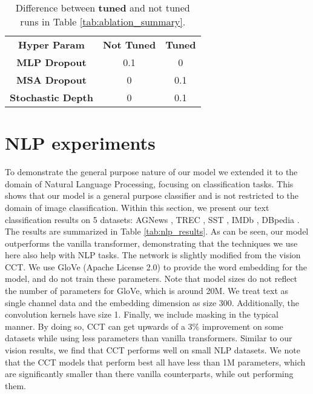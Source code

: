 \documentclass[10pt,twocolumn,letterpaper]{article}
\begin{document}
\setlength{\tabcolsep}{4pt}
\begin{table}[ht]
    \begin{center}
        \caption{Difference between \textbf{tuned} and not tuned runs in Table \ref{tab:ablation_summary}.}
        \label{tab:tuned_comparison}
        \begin{tabular}{c|cc}
            \hline\noalign{\smallskip}
            \textbf{Hyper Param} & \textbf{Not Tuned} & \textbf{Tuned} \\
            \noalign{\smallskip}
            \hline
            \noalign{\smallskip}
            \textbf{MLP Dropout} & 0.1 & 0 \\
            \textbf{MSA Dropout} & 0 & 0.1 \\
            \textbf{Stochastic Depth} & 0 & 0.1 \\
            \hline
        \end{tabular}
    \end{center}
\end{table}

 


\section{NLP experiments}
\label{appdx:nlp_exp}

To demonstrate the general purpose nature of our model we extended it to the domain of Natural Language Processing, focusing on classification tasks.
This shows that our model is a general purpose classifier and is not restricted to the domain of image classification.
Within this section, we present our text classification results on 5 datasets: AGNews \cite{zhang2015character}, TREC \cite{liroth2002learning}, SST \cite{socher2013recursive}, IMDb \cite{maas2011learning}, DBpedia \cite{auer2007dbpedia}.
The results are summarized in Table \ref{tab:nlp_results}.
As can be seen, our model outperforms the vanilla transformer, demonstrating that the techniques we use here also help with NLP tasks.
The network is slightly modified from the vision CCT.
We use GloVe (Apache License 2.0) \cite{pennington2014glove} to provide the word embedding for the model, and do not train these parameters.
Note that model sizes do not reflect the number of parameters for GloVe, which is around 20M.
We treat text as single channel data and the embedding dimension as size 300.
Additionally, the convolution kernels have size 1.
Finally, we include masking in the typical manner.
By doing so, CCT can get upwards of a 3\% improvement on some datasets while using less parameters than vanilla transformers.
Similar to our vision results, we find that CCT performs well on small NLP datasets.
We note that the CCT models that perform best all have less than 1M parameters, which are significantly smaller than there vanilla counterparts, while out performing them.
\end{document}
